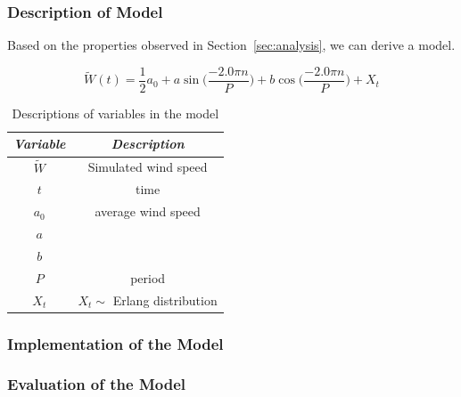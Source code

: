 \documentclass[11pt, letterpaper]{article}
\begin{document}
\subsubsection{Description of Model}
Based on the properties observed in Section~\ref{sec:analysis}, we can derive a model.

\begin{equation}
\tilde{W}(t) = \frac{1}{2}a_0 + a \sin\Big(\frac{-2.0 \pi n}{P}\Big) + b \cos\Big(\frac{-2.0 \pi n}{P}\Big) + X_t
\end{equation}

\begin{table}[H]
  \centering
  \begin{tabular}{c c} \hline
  \emph{Variable} & \emph{Description}\\ \hline
  $\tilde{W}$ & Simulated wind speed \\ \hline
  $t$ & time \\ \hline
  $a_0$ & average wind speed \\ \hline
  $a$ & \\ \hline
  $b$ &  \\ \hline
  $P$ & period  \\ \hline
  $X_t$ & $X_t \sim$ Erlang distribution \\ \hline 
  \end{tabular}
  \caption{Descriptions of variables in the model}
  \label{tab:analysis-ft-values}
\end{table}

\subsubsection{Implementation of the Model}

\subsubsection{Evaluation of the Model}
\end{document}
